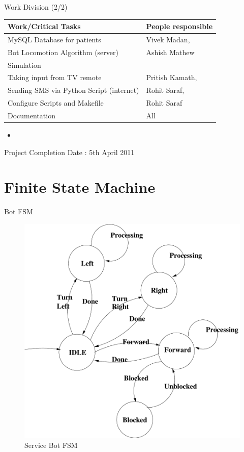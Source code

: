 \documentclass{beamer}
\begin{document}
\begin{frame}{Work Division (2/2)}
\begin{tabular}{|l|l|}
\hline
\textbf{Work/Critical Tasks} & \textbf{People responsible} \\
\hline
\hline
MySQL Database for patients & Vivek Madan, \\
Bot Locomotion Algorithm (server) & Ashish Mathew \\
Simulation & \\
\hline
Taking input from TV remote & Pritish Kamath,\\
Sending SMS via Python Script (internet) & Rohit Saraf,\\
\hline
Configure Scripts and Makefile & Rohit Saraf \\
\hline
Documentation & All \\
\hline
\end{tabular}
\begin{itemize}
\item[]
\end{itemize}
Project Completion Date : 5th April 2011
\end{frame}

\section{Finite State Machine}
\begin{frame}{Bot FSM}
\begin{figure}
\centerline{\includegraphics[scale=0.35]{fsm.pdf}}
\caption{Service Bot FSM}\label{fig:exp}
\end{figure}
\end{frame}
\end{document}
